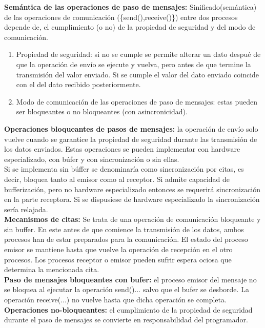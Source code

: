 \documentclass[a4paper,11pt]{article}
\begin{document}
\textbf{Semántica de las operaciones de paso de mensajes:} Sinificado(semántica) de las operaciones de comunicación (\{send(),receive()\}) entre dos procesos depende de, el cumplimiento (o no) de la propiedad de seguridad y del modo de comunicación.

\begin{enumerate}
\item Propiedad de seguridad: si no se cumple se permite alterar un dato despué de que la operación de envío se ejecute y vuelva, pero antes de que termine la transmisión del valor enviado. Si se cumple el valor del dato enviado coincide con el del dato recibido posteriormente.

\item Modo de comunicación de las operaciones de paso de mensajes: estas pueden ser bloqueantes o no bloqueantes (con asincronicidad).
\end{enumerate}

\textbf{Operaciones bloqueantes de pasos de mensajes:} la operación de envío solo vuelve cuando se garantice la propiedad de seguridad durante las transmisión de los datos enviados. Estas operaciones se pueden implementar con hardware especializado, con búfer y con sincronización o sin ellas. \\

Si se implementa sin búffer se denominaría como sincronización por citas, es decir, bloquea tanto al emisor como al receptor. Si admite capacidad de bufferización, pero no hardware especializado entonces se requerirá sincronización en la parte receptora. Si se dispusiese de hardware especializado la sincronización sería relajada. \\

\textbf{Mecanismos de citas:} Se trata de una operación de comunicación bloqueante y sin buffer. En este antes de que comience la transmisión de los datos, ambos procesos han de estar preparados para la comunicación. El estado del proceso emisor se mantiene hasta que vuelve la operación de recepción en el otro procesos. Los procesos receptor o emisor pueden sufrir espera ociosa que determina la mencionada cita. \\

\textbf{Paso de mensajes bloqueantes con bufer:} el proceso emisor del mensaje no se bloquea al ejecutar la operación send()... salvo que el bufer se desborde. La operación receive(...) no vuelve hasta que dicha operación se completa. \\

\textbf{Operaciones no-bloqueantes:} el cumplimiento de la propiedad de seguridad durante el paso de mensajes se convierte en responsabilidad del programador.
\end{document}
